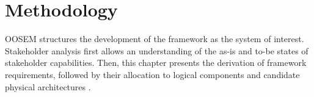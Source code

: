 \chapter{Methodology}
\label{ch:solucion}

OOSEM structures the development of the framework as the system of interest. Stakeholder analysis first allows an understanding of the as-is and to-be states of stakeholder capabilities. Then, this chapter presents the derivation of framework requirements, followed by their allocation to logical components and candidate physical architectures \citep[Chap.~17]{friedenthal2014practical}.






